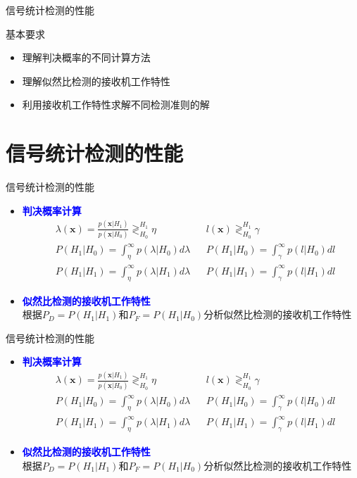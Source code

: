 \begin{frame}{信号统计检测的性能}
\begin{block}{基本要求}
	\begin{itemize} 
		\item 理解判决概率的不同计算方法
		\item 理解似然比检测的接收机工作特性
		\item 利用接收机工作特性求解不同检测准则的解	
	\end{itemize}
\end{block}
\end{frame}

\section{信号统计检测的性能}

\begin{frame}[shrink]{信号统计检测的性能}
\begin{itemize}
	\item \textbf{\textcolor{blue}{判决概率计算}}
		\begin{align*}
		&\lambda(\bm{x})=\frac{p(\bm{x}|H_1)}{p(\bm{x}|H_0)}\mathop{\gtrless}_{H_0}^{H_1}\eta && l(\bm{x}) \mathop{\gtrless}_{H_0}^{H_1}\gamma\\
		&P(H_1|H_0)=\int_{\eta}^{\infty}p(\lambda|H_0)d\lambda && P(H_1|H_0)=\int_{\gamma}^{\infty}p(l|H_0)dl\\
		&P(H_1|H_1)=\int_{\eta}^{\infty}p(\lambda|H_1)d\lambda && P(H_1|H_1)=\int_{\gamma}^{\infty}p(l|H_1)dl
		\end{align*}
	\item \textbf{\textcolor{blue}{似然比检测的接收机工作特性}}\\
根据$P_D=P(H_1|H_1)$和$P_F=P(H_1|H_0)$分析似然比检测的接收机工作特性
\end{itemize}
\rightline{\texttt{[image: R0R1]}}
\end{frame}

\begin{frame}[shrink]{信号统计检测的性能}
\begin{itemize}
	\item \textbf{\textcolor{blue}{判决概率计算}}
	\begin{align*}
	&\lambda(\bm{x})=\frac{p(\bm{x}|H_1)}{p(\bm{x}|H_0)}\mathop{\gtrless}_{H_0}^{H_1}\eta && l(\bm{x}) \mathop{\gtrless}_{H_0}^{H_1}\gamma\\
	&P(H_1|H_0)=\int_{\eta}^{\infty}p(\lambda|H_0)d\lambda && P(H_1|H_0)=\int_{\gamma}^{\infty}p(l|H_0)dl\\
	&P(H_1|H_1)=\int_{\eta}^{\infty}p(\lambda|H_1)d\lambda && P(H_1|H_1)=\int_{\gamma}^{\infty}p(l|H_1)dl
	\end{align*}
	\item \textbf{\textcolor{blue}{似然比检测的接收机工作特性}}\\
	根据$P_D=P(H_1|H_1)$和$P_F=P(H_1|H_0)$分析似然比检测的接收机工作特性
\end{itemize}
\rightline{\texttt{[image: R0R1]}}
\end{frame}

